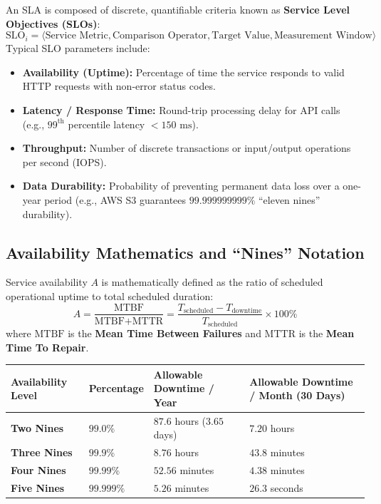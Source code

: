 \documentclass[11pt,a4paper,openany]{report}
\begin{document}
An SLA is composed of discrete, quantifiable criteria known as \textbf{Service Level Objectives (SLOs)}:
\begin{equation}
\text{SLO}_i = \langle \text{Service Metric}, \text{Comparison Operator}, \text{Target Value}, \text{Measurement Window} \rangle
\end{equation}
Typical SLO parameters include:
\begin{itemize}[leftmargin=*]
  \item \textbf{Availability (Uptime):} Percentage of time the service responds to valid HTTP requests with non-error status codes.
  \item \textbf{Latency / Response Time:} Round-trip processing delay for API calls (e.g., $99^{\text{th}}$ percentile latency $< 150\text{ ms}$).
  \item \textbf{Throughput:} Number of discrete transactions or input/output operations per second (IOPS).
  \item \textbf{Data Durability:} Probability of preventing permanent data loss over a one-year period (e.g., AWS S3 guarantees $99.999999999\%$ ``eleven nines'' durability).
\end{itemize}

\subsection{Availability Mathematics and ``Nines'' Notation}
Service availability $A$ is mathematically defined as the ratio of scheduled operational uptime to total scheduled duration:
\begin{equation}
A = \frac{\text{MTBF}}{\text{MTBF} + \text{MTTR}} = \frac{T_{\text{scheduled}} - T_{\text{downtime}}}{T_{\text{scheduled}}} \times 100\%
\end{equation}
where $\text{MTBF}$ is the \textbf{Mean Time Between Failures} and $\text{MTTR}$ is the \textbf{Mean Time To Repair}.

\begin{center}
\begin{tabularx}{\textwidth}{>{\bfseries}l l X X}
\toprule
Availability Level & Percentage & Allowable Downtime / Year & Allowable Downtime / Month (30 Days)\\
\midrule
Two Nines & $99.0\%$ & $87.6$ hours ($3.65$ days) & $7.20$ hours\\
Three Nines & $99.9\%$ & $8.76$ hours & $43.8$ minutes\\
Four Nines & $99.99\%$ & $52.56$ minutes & $4.38$ minutes\\
Five Nines & $99.999\%$ & $5.26$ minutes & $26.3$ seconds\\
\bottomrule
\end{tabularx}
\end{center}
\end{document}

